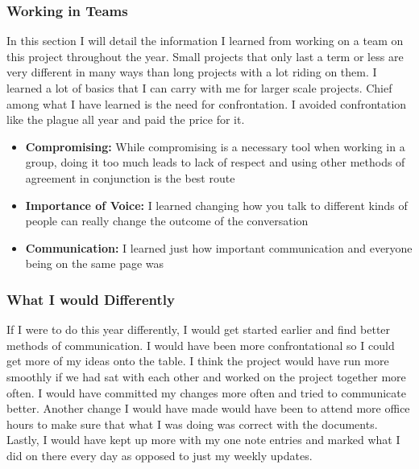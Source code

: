 \documentclass[draftclsnofoot, onecolumn, compsoc, 10pt]{IEEEtran}
\begin{document}
\subsubsection{Working in Teams}
In this section I will detail the information I learned from working on a team on this project throughout the year. Small projects that only last a term or less are very different in many ways than long projects with a lot riding on them. I learned a lot of basics that I can carry with me for larger scale projects. Chief among what I have learned is the need for confrontation. I avoided confrontation like the plague all year and paid the price for it. 
\begin{itemize}
    \item \textbf{Compromising:} While compromising is a necessary tool when working in a group, doing it too much leads to lack of respect and using other methods of agreement in conjunction is the best route
    \item \textbf{Importance of Voice:} I learned changing how you talk to different kinds of people can really change the outcome of the conversation
    \item \textbf{Communication:} I learned just how important communication and everyone being on the same page was
\end{itemize}

\subsubsection{What I would Differently}
If I were to do this year differently, I would get started earlier and find better methods of communication. I would have been more confrontational so I could get more of my ideas onto the table. I think the project would have run more smoothly if we had sat with each other and worked on the project together more often. I would have committed my changes more often and tried to communicate better. Another change I would have made would have been to attend more office hours to make sure that what I was doing was correct with the documents. Lastly, I would have kept up more with my one note entries and marked what I did on there every day as opposed to just my weekly updates.
\end{document}
